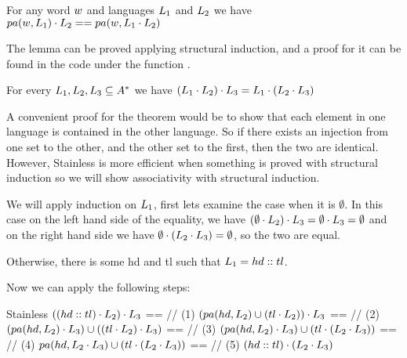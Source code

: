 \begin{lemma}
	\label{lem:replaceConcatPrepend}
	For any word $w$ and languages $L_{1}$ and $L_{2}$ we have $pa(w, L_{1}) \cdot L_{2} == pa(w, L_{1} \cdot L_{2})$
\end{lemma}

The lemma can be proved applying structural induction, and a proof for it can be found in the code under the function .

\begin{theorem}[Associativity]
	\label{the:associativity}
	For every $L_{1}, L_{2}, L_{3} \subseteq A^{*}$ we have $(L_{1} \cdot L_{2}) \cdot L_{3}  = L_{1} \cdot ( L_{2} \cdot L_{3} )$
\end{theorem}

A convenient proof for the theorem would be to show that each element in one language is contained in the other language. So if there exists an injection from one set to the other, and the other set to the first, then the two are identical. However, Stainless is more efficient when something is proved with structural induction so we will show associativity with structural induction.

We will apply induction on $L_{1}$, first lets examine the case when it is $\emptyset$. In this case on the left hand side of the equality, we have $(\emptyset \cdot L_{2}) \cdot L_{3} = \emptyset \cdot L_{3} = \emptyset$ and on the right hand side we have $\emptyset \cdot ( L_{2} \cdot L_{3} ) = \emptyset$, so the two are equal.

Otherwise, there is some hd and tl such that $L_{1} = hd :: tl$.

Now we can apply the following steps:

\begin{ShortCode}{Stainless}
 $((hd::tl) \cdot L_{2}) \cdot L_{3}$ == // (1)
 $(pa(hd, L_{2}) \cup (tl \cdot L_{2})) \cdot L_{3}$ == // (2)
 $(pa(hd, L_{2}) \cdot L_{3}) \cup ((tl \cdot L_{2}) \cdot L_{3})$ == // (3)
 $(pa(hd, L_{2}) \cdot L_{3}) \cup (tl \cdot (L_{2} \cdot L_{3}))$ == // (4)
 $pa(hd, L_{2} \cdot L_{3}) \cup (tl \cdot (L_{2} \cdot L_{3}))$ == // (5)
 $(hd::tl) \cdot (L_{2} \cdot L_{3})$
\end{ShortCode}
	
